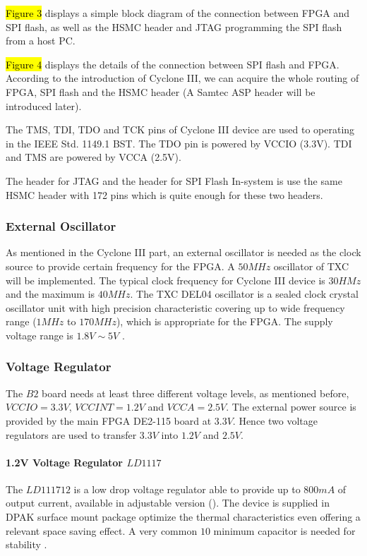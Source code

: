 \hl{Figure 3} displays a simple block diagram of the connection between FPGA and SPI flash, as well as the HSMC header and JTAG programming the SPI flash from a host PC.


\hl{Figure 4} displays the details of the connection between SPI flash and FPGA. According to the introduction of Cyclone III, we can acquire the whole routing of FPGA, SPI flash and the HSMC header (A Samtec ASP header will be introduced later).



The TMS, TDI, TDO and TCK pins of Cyclone III device are used to operating in the IEEE Std. 1149.1 BST. The TDO pin is powered by VCCIO (3.3V). TDI and TMS are powered by VCCA (2.5V).

The header for JTAG and the header for SPI Flash In-system is use the same HSMC header with 172 pins which is quite enough for these two headers.





\subsubsection{External Oscillator}

As mentioned in the Cyclone III part, an external oscillator is needed as the clock source to provide certain frequency for the FPGA. A $50MHz$ oscillator of TXC will be implemented. The typical clock frequency for Cyclone III device is $30HMz$ and the maximum is $40MHz$. The TXC DEL04 oscillator is a sealed clock crystal oscillator unit with high precision characteristic covering up to wide frequency range ($1MHz$ to $170 MHz$), which is appropriate for the FPGA. The supply voltage range is $1.8V \sim 5V$ \citep{TXC:osc_datasheet}.



\subsubsection{Voltage Regulator}

The $B2$ board needs at least three different voltage levels, as mentioned before, $VCCIO=3.3V$, $VCCINT= 1.2V$ and $VCCA=2.5V$. The external power source is provided by the main FPGA DE2-115 board at $3.3V$. Hence two voltage regulators are used to transfer $3.3V$ into $1.2V$ and $2.5V$.

\paragraph{1.2V Voltage Regulator \texorpdfstring{$LD1117$}{LD1117}}
The $LD111712$ is a low drop voltage regulator able to provide up to $800mA$ of output current, available in adjustable version (). The device is supplied in DPAK surface mount package optimize the thermal characteristics even offering a relevant space saving effect. A very common $10$ minimum capacitor is needed for stability \citep{STMicro:2012:LD1117xx}.

